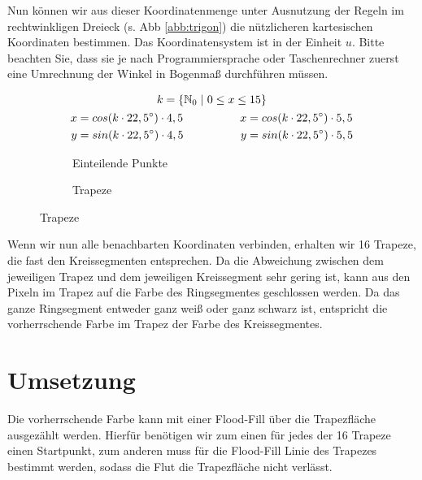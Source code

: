 	Nun können wir aus dieser Koordinatenmenge unter Ausnutzung der Regeln im rechtwinkligen Dreieck (s. Abb \ref{abb:trigon}) die nützlicheren kartesischen Koordinaten bestimmen. Das Koordinatensystem ist in der Einheit \(u\). Bitte beachten Sie, dass sie je nach Programmiersprache oder Taschenrechner zuerst eine Umrechnung der Winkel in Bogenmaß durchführen müssen.

	\begin{gather}
	k = \{\mathbb{N}_0 \hspace{0.3em}|\hspace{0.3em} 0 \le x \le 15\} \\
	\begin{split}
	x &= cos(k \cdot 22,5^{\circ}) \cdot 4,5 \\
	y &= sin(k \cdot 22,5^{\circ}) \cdot 4,5
	\end{split}
	\hspace{5em}
	\begin{split}
	x &= cos(k \cdot 22,5^{\circ}) \cdot 5,5 \\
	y &= sin(k \cdot 22,5^{\circ}) \cdot 5,5
	\end{split}
	\end{gather}

	\begin{figure}[!ht]
		\begin{subfigure}[b]{0.5\textwidth}
			\centering	
			
			\caption{Einteilende Punkte}
		\end{subfigure}
		\begin{subfigure}[b]{0.5\textwidth}
			\centering	
			
			\caption{Trapeze}
		\end{subfigure}
	\end{figure}

	Wenn wir nun alle benachbarten Koordinaten verbinden, erhalten wir 16 Trapeze, die fast den Kreissegmenten entsprechen. Da die Abweichung zwischen dem jeweiligen Trapez und dem jeweiligen Kreissegment sehr gering ist, kann aus den Pixeln im Trapez auf die Farbe des Ringsegmentes geschlossen werden. Da das ganze Ringsegment entweder ganz weiß oder ganz schwarz ist, entspricht die vorherrschende Farbe im Trapez der Farbe des Kreissegmentes.
\section{Umsetzung}
	Die vorherrschende Farbe kann mit einer Flood-Fill über die Trapezfläche ausgezählt werden. Hierfür benötigen wir zum einen für jedes der 16 Trapeze einen Startpunkt, zum anderen muss für die Flood-Fill Linie des Trapezes bestimmt werden, sodass die Flut die Trapezfläche nicht verlässt.

